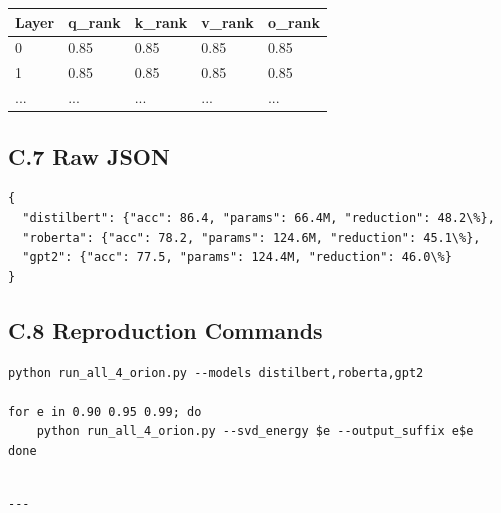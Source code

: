 \begin{table}[H]
\centering
\small
\begin{tabular}{lllll}
\toprule
\textbf{Layer} & \textbf{q\_rank} & \textbf{k\_rank} & \textbf{v\_rank} & \textbf{o\_rank} \\
\midrule
0 & 0.85 & 0.85 & 0.85 & 0.85 \\
1 & 0.85 & 0.85 & 0.85 & 0.85 \\
... & ... & ... & ... & ... \\
\bottomrule
\end{tabular}
\end{table}

\subsection{C.7 Raw JSON}

\begin{lstlisting}
{
  "distilbert": {"acc": 86.4, "params": 66.4M, "reduction": 48.2\%},
  "roberta": {"acc": 78.2, "params": 124.6M, "reduction": 45.1\%},
  "gpt2": {"acc": 77.5, "params": 124.4M, "reduction": 46.0\%}
}
\end{lstlisting}

\subsection{C.8 Reproduction Commands}

\begin{lstlisting}
python run_all_4_orion.py --models distilbert,roberta,gpt2

for e in 0.90 0.95 0.99; do
    python run_all_4_orion.py --svd_energy $e --output_suffix e$e
done
\end{lstlisting}
\begin{lstlisting}

---
\end{lstlisting}